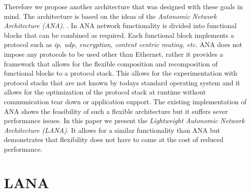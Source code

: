 \documentclass{sig-alternate}
\newcommand{\wolfgang}[1]{\textcolor{blue}{\emph{WM: #1}}}
\begin{document}
Therefore we propose another architecture that was designed with these goals in mind.
The architecture is based on the ideas of the \textit{Autonomic Network Architecture (ANA)}. \cite{ANAJournal}. In ANA network functionality is divided into functional blocks that can be combined as required. Each functional block implements a protocol such as \textit{ip, udp, encryption, content centric routing, etc.} ANA does not impose any protocols to be used other than Ethernet, rather it provides a framework that allows for the flexible composition and recomposition of functional blocks to a protocol stack. This allows for the experimentation with protocol stacks that are not known by todays standard operating system and it allows for the optimization of the protocol stack at runtime without communication tear down or application support.
The existing implementation of ANA shows the feasibility of such a flexible architecture but it suffers sever performance issues. 
In this paper we present the \textit{Lightweight Autonomic Network Architecture (LANA)}. It allows for a similar functionality than ANA but demonstrates that flexibility does not have to come at the cost of reduced performance.



\section{LANA}



\end{document}
